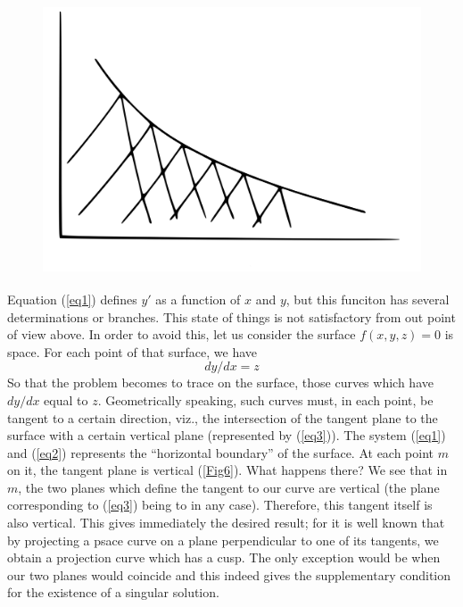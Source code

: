\documentclass[12pt,oneside]{book}
\begin{document}
\begin{figure}
    \centering
    \includegraphics[height=8cm]{Fig5.jpeg}
    \caption{}
    \label{Fig5}
\end{figure}

Equation (\ref{eq1}) defines $y'$ as a function of $x$ and $y$, but this funciton has several determinations or branches. This state of things is not satisfactory from out point of view above. In order to avoid this, let us consider the surface $f(x,y,z)=0$ is space. For each point of that surface, we have 
\begin{equation}
    dy/dx=z
    \label{eq3}
\end{equation}
So that the problem becomes to trace on the surface, those curves which have $dy/dx$ equal to $z$. Geometrically speaking, such curves must, in each point, be tangent to a certain direction, viz., the intersection of the tangent plane to the surface with a certain vertical plane (represented by (\ref{eq3})). The system (\ref{eq1}) and (\ref{eq2}) represents the ``horizontal boundary'' of the surface. At each point $m$ on it, the tangent plane is vertical (\ref{Fig6}). What happens there? We see that in $m$, the two planes which define the tangent to our curve are vertical (the plane corresponding to (\ref{eq3}) being to in any case). Therefore, this tangent itself is also vertical. This gives immediately the desired result; for it is well known that by projecting a psace curve on a plane perpendicular to one of its tangents, we obtain a projection curve which has a cusp. The only exception would be when our two planes would coincide and this indeed gives the supplementary condition for the existence of a singular solution. \par 
\end{document}
